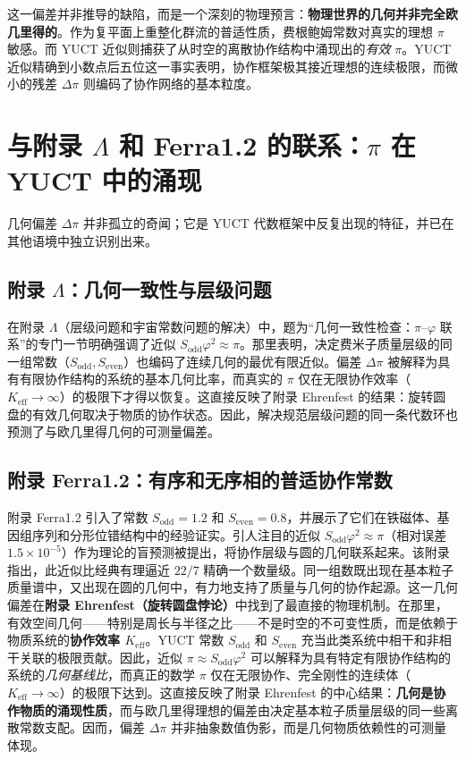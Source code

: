 \documentclass[12pt,a4paper]{article}
\begin{document}
	这一偏差并非推导的缺陷，而是一个深刻的物理预言：\textbf{物理世界的几何并非完全欧几里得的}。作为复平面上重整化群流的普适性质，费根鲍姆常数对真实的理想 \(\pi\) 敏感。而 YUCT 近似则捕获了从时空的离散协作结构中涌现出的\textit{有效} \(\pi\)。YUCT 近似精确到小数点后五位这一事实表明，协作框架极其接近理想的连续极限，而微小的残差 \(\Delta\pi\) 则编码了协作网络的基本粒度。
	
	\section{与附录 \(\Lambda\) 和 Ferra1.2 的联系：\(\pi\) 在 YUCT 中的涌现}
	
	几何偏差 \(\Delta\pi\) 并非孤立的奇闻；它是 YUCT 代数框架中反复出现的特征，并已在其他语境中独立识别出来。
	
	\subsection{附录 \(\Lambda\)：几何一致性与层级问题}
	
	在附录 \(\Lambda\)（层级问题和宇宙常数问题的解决）中，题为“几何一致性检查：\(\pi\)–\(\varphi\) 联系”的专门一节明确强调了近似 \(S_{\mathrm{odd}}\varphi^2 \approx \pi\)。那里表明，决定费米子质量层级的同一组常数（\(S_{\mathrm{odd}}, S_{\mathrm{even}}\)）也编码了连续几何的最优有限近似。偏差 \(\Delta\pi\) 被解释为具有有限协作结构的系统的基本几何比率，而真实的 \(\pi\) 仅在无限协作效率（\(K_{\mathrm{eff}} \to \infty\)）的极限下才得以恢复。这直接反映了附录 Ehrenfest 的结果：旋转圆盘的有效几何取决于物质的协作状态。因此，解决规范层级问题的同一条代数环也预测了与欧几里得几何的可测量偏差。
	
	\subsection{附录 Ferra1.2：有序和无序相的普适协作常数}
	
	附录 Ferra1.2 引入了常数 \(S_{\mathrm{odd}}=1.2\) 和 \(S_{\mathrm{even}}=0.8\)，并展示了它们在铁磁体、基因组序列和分形位错结构中的经验证实。引人注目的近似 \(S_{\mathrm{odd}}\varphi^2 \approx \pi\)（相对误差 \(1.5\times10^{-5}\)）作为理论的盲预测被提出，将协作层级与圆的几何联系起来。该附录指出，此近似比经典有理逼近 \(22/7\) 精确一个数量级。同一组数既出现在基本粒子质量谱中，又出现在圆的几何中，有力地支持了质量与几何的协作起源。这一几何偏差在\textbf{附录 Ehrenfest（旋转圆盘悖论）}中找到了最直接的物理机制。在那里，有效空间几何——特别是周长与半径之比——不是时空的不可变性质，而是依赖于物质系统的\textbf{协作效率 \(K_{\mathrm{eff}}\)}。YUCT 常数 \(S_{\mathrm{odd}}\) 和 \(S_{\mathrm{even}}\) 充当此类系统中相干和非相干关联的极限贡献。因此，近似 \(\pi \approx S_{\mathrm{odd}}\varphi^2\) 可以解释为具有特定有限协作结构的系统的\textit{几何基线比}，而真正的数学 \(\pi\) 仅在无限协作、完全刚性的连续体（\(K_{\mathrm{eff}} \to \infty\)）的极限下达到。这直接反映了附录 Ehrenfest 的中心结果：\textbf{几何是协作物质的涌现性质}，而与欧几里得理想的偏差由决定基本粒子质量层级的同一些离散常数支配。因而，偏差 \(\Delta\pi\) 并非抽象数值伪影，而是几何物质依赖性的可测量体现。
	
\end{document}
